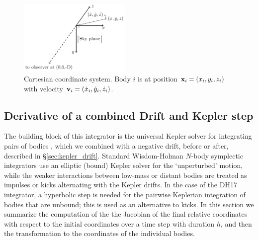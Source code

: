 \documentclass[fleqn,usenatbib,twocolumn]{mnras}
\begin{document}
\begin{figure}
\center
\includegraphics[width=0.48\textwidth]{cartesian_diagram.pdf}
\caption{
Cartesian coordinate system.  Body $i$ is at position
${\bf x}_i=(x_i, y_i, z_i)$ with velocity ${\bf v}_i =(\dot x_i, \dot y_i, \dot z_i)$.
}\label{fig:coordinates}
\vspace{0.3cm}
\end{figure}

\subsection{Derivative of a combined Drift and Kepler step} \label{sec:kepler_step}

The building block of this integrator is the universal Kepler solver for
integrating pairs of bodies \citep{Wisdom2015}, which we combined with
a negative drift, before or after, described in \S \ref{sec:kepler_drift}.
Standard Wisdom-Holman $N$-body symplectic
integrators \citep{Wisdom1991} use an elliptic (bound) Kepler solver
for the `unperturbed' motion, while the weaker interactions between
low-mass or distant bodies are treated as impulses or kicks alternating with
the Kepler drifts.  In the case of the DH17 integrator, a hyperbolic step
is needed for the pairwise Keplerian integration of bodies that are unbound;
this is used as an alternative to kicks.  In this section we summarize
the computation of the the Jacobian of the final relative coordinates with respect
to the initial coordinates over a time step with duration $h$,  and
then the transformation to the coordinates of the individual bodies.
\end{document}
